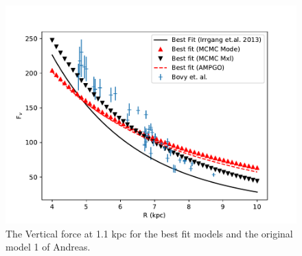 \documentclass[fleqn,usenatbib]{mnras}
\begin{document}
\begin{figure}
\includegraphics[width=\columnwidth]{Model_III/Plots/Reid(2014)/VertForce_ModelIII_10000_100.pdf}
\caption{The Vertical force at 1.1 kpc for the best fit models and the original model 1 of Andreas.
}
\label{fig:Model3_vertif}
\end{figure}
\end{document}
